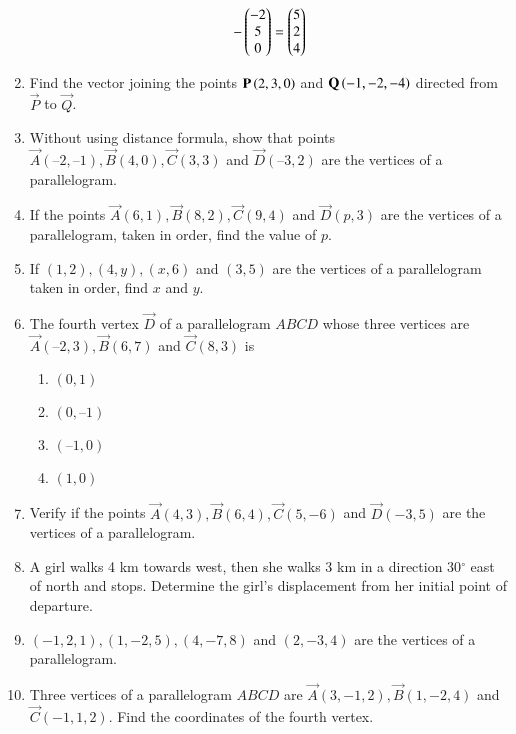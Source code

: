\begin{enumerate}[label=\thesubsection.\arabic*, ref=\thesubsection.\theenumi]
\begin{align}
	-\begin{pmatrix}-2 \\ 5 \\ 0\end{pmatrix} = 
	\begin{pmatrix}5 \\ 2 \\ 4\end{pmatrix}  
\end{align}
\item Find the vector joining the points $\mathbf{P}\left(2, 3, 0\right)$ and $\mathbf{Q}\left(-1, -2, -4\right)$ directed from $\vec{P}$ to $\vec{Q}$.
\item Without using distance formula,  show that points $\vec{A}(– 2,  – 1),  \vec{B}(4,  0),  \vec{C}(3,  3)$ and $\vec{D}(–3,  2)$ are the vertices of a parallelogram.
\label{chapters/11/10/1/9}
\\
\solution

\item If the points $\vec{A}(6,  1),  \vec{B}(8,  2),  \vec{C}(9,  4)$ and $\vec{D}(p,  3)$ are the vertices of a parallelogram,  taken in order,  find the value of $p$.
\label{10/7/0/10}
\item 
If $(1,  2),  (4,  y),  (x,  6)$ and $(3,  5)$ are the vertices of a parallelogram taken in order,  find $x$ and $y$.
\label{10/7/2/6}
	\\
		\solution
	
\item The fourth vertex $\vec{D}$ of a parallelogram $ABCD$ whose three vertices are
	$\vec{A} (–2,  3),  \vec{B} (6,  7)$ and  $\vec{C} (8,  3)$ is
\begin{enumerate}
	\item $(0,  1)$
	\item $(0,  –1)$
	\item $ (–1, 0)$
	\item$(1,  0)$
\end{enumerate}
\item Verify if the points $\vec{A}(4, 3),  \vec{B}(6, 4), \vec{C}(5, -6)$  and  $\vec{D}(-3, 5)$ are the vertices of a parallelogram.
\item A girl walks 4 km towards west,  then she walks 3 km in a direction 30$^{\circ}$ east of north and stops. Determine the girl's displacement from her initial point of departure.\\
	\solution
		
\item $(-1, 2, 1),  (1, -2, 5),  (4, -7, 8)$ and $(2, -3, 4)$ are the vertices of a parallelogram.
\item Three vertices of a parallelogram $ABCD$ are $\vec{A}(3, -1, 2),  \vec{B}(1, -2, 4)$ and $\vec{C}(-1, 1, 2)$. Find the coordinates of the fourth vertex.

\end{enumerate}
